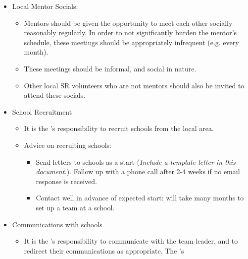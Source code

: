 \begin{itemize}
\item Local Mentor Socials:
  \begin{itemize}
  \item Mentors should be given the opportunity to meet each other socially reasonably regularly.  In order to not significantly burden the mentor's schedule, these meetings should be appropriately infrequent (e.g. every month).
  \item These meetings should be informal, and social in nature.
  \item Other local SR volunteers who are not mentors should also be invited to attend these socials.
  \end{itemize}

\item School Recruitment
  \begin{itemize}
  \item It is the 's responsibility to recruit schools from the local area.
  \item Advice on recruiting schools:
    \begin{itemize}
    \item Send letters to schools as a start (\textit{Include a template letter in this document.}).  Follow up with a phone call after 2-4 weeks if no email response is received.
    \item Contact well in advance of expected start: will take many months to set up a team at a school.
    \end{itemize}
  \end{itemize}

\item Communications with schools
  \begin{itemize}
  \item It is the 's responsibility to communicate with the team leader, and to redirect their communications as appropriate.  The 's 
  \end{itemize}

\end{itemize}
